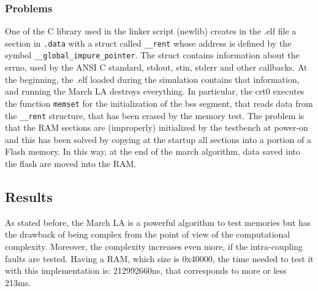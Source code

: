 \documentclass[paper=a4, fontsize=10pt]{scrartcl}	%
\begin{document}
	\subsubsection{Problems}
	One of the C library used in the linker script (newlib) creates in the .elf file a section in \texttt{.data} with a struct called \texttt{\_\_rent} whose address is defined by the symbol \texttt{\_\_global\_impure\_pointer}. The struct contains information about the errno, used by the ANSI C standard, stdout, stin, stderr and other callbacks.
	At the beginning, the .elf loaded during the simulation contains that information, and running the March LA destroys everything. In particular, the crt0 executes the function \texttt{memset} for the initialization of the bss segment, that reads data from the \texttt{\_\_rent} structure, that has been erased by the memory test.
	The problem is that the RAM sections are (improperly) initialized by the testbench at power-on and this has been solved by copying at the startup all sections into a portion of a Flash memory. In this way, at the end of the march algorithm, data saved into the flash are moved into the RAM.
	
	\subsection{Results}
	As stated before, the March LA is a powerful algorithm to test memories but has the drawback of being complex from the point of view of the computational complexity. Moreover, the complexity increases even more, if the intra-coupling faults are tested. Having a RAM, which size is 0x40000, the time needed to test it with this implementation is: 212992660ns, that corresponds to more or less 213ms.
\end{document}
